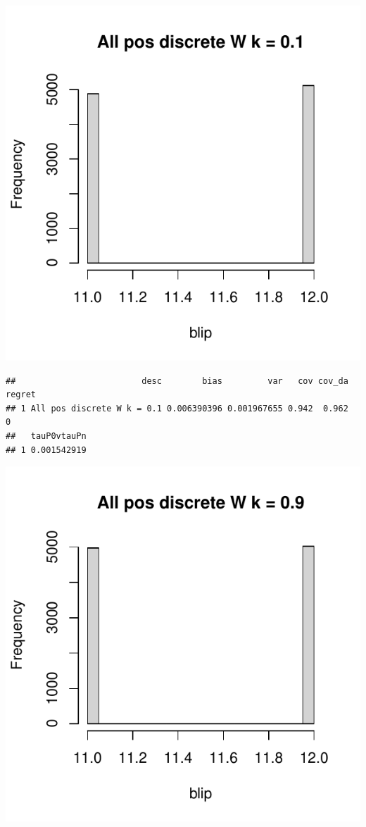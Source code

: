 \documentclass[11pt]{article}\usepackage[]{graphicx}\usepackage[table]{xcolor}
\makeatletter
\def\maxwidth{ %
  \ifdim\Gin@nat@width>\linewidth
    \linewidth
  \else
    \Gin@nat@width
  \fi
}
\newenvironment{kframe}{%
 \def\at@end@of@kframe{}%
 \ifinner\ifhmode%
  \def\at@end@of@kframe{\end{minipage}}%
  \begin{minipage}{\columnwidth}%
 \fi\fi%
 \def\FrameCommand##1{\hskip\@totalleftmargin \hskip-\fboxsep
 \colorbox{shadecolor}{##1}\hskip-\fboxsep
     \hskip-\linewidth \hskip-\@totalleftmargin \hskip\columnwidth}%
 \MakeFramed {\advance\hsize-\width
   \@totalleftmargin\z@ \linewidth\hsize
   \@setminipage}}%
 {\par\unskip\endMakeFramed%
 \at@end@of@kframe}
\newenvironment{knitrout}{}{} %
\makeatother
\begin{document}










\begin{knitrout}
\color{fgcolor}
\includegraphics[width=\maxwidth]{figure/unnamed-chunk-4-1} 
\begin{kframe}\begin{verbatim}
##                         desc        bias         var   cov cov_da regret
## 1 All pos discrete W k = 0.1 0.006390396 0.001967655 0.942  0.962      0
##   tauP0vtauPn
## 1 0.001542919
\end{verbatim}
\end{kframe}
\includegraphics[width=\maxwidth]{figure/unnamed-chunk-4-2} 

\end{knitrout}
\end{document}
